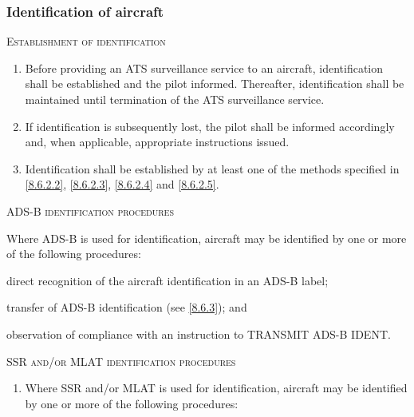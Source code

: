 
\subsubsection{Identification of aircraft}

\begin{enumeratesc}
    \item \textsc{Establishment of identification}
    \begin{enumerate}
        \item Before providing an ATS surveillance service to an aircraft, identification shall be established and the pilot informed. Thereafter, identification shall be maintained until termination of the ATS surveillance service.
        \item If identification is subsequently lost, the pilot shall be informed accordingly and, when applicable, appropriate instructions issued.
        \item Identification shall be established by at least one of the methods specified in \ref{8.6.2.2}, \ref{8.6.2.3}, \ref{8.6.2.4} and \ref{8.6.2.5}.
    \end{enumerate}

    \item \textsc{ADS-B identification procedures} \label{8.6.2.2}
    \begin{enumempty}
        \item Where ADS-B is used for identification, aircraft may be identified by one or more of the following procedures:
    \end{enumempty}
    \begin{enumalph}
        \item direct recognition of the aircraft identification in an ADS-B label;
        \item transfer of ADS-B identification (see \ref{8.6.3}); and
        \item observation of compliance with an instruction to TRANSMIT ADS-B IDENT.
    \end{enumalph}
    
    \item \textsc{SSR and/or MLAT identification procedures} \label{8.6.2.3}
    \begin{enumerate}
        \item Where SSR and/or MLAT is used for identification, aircraft may be identified by one or more of the following procedures:
        

\end{enumerate}
\end{enumeratesc}
